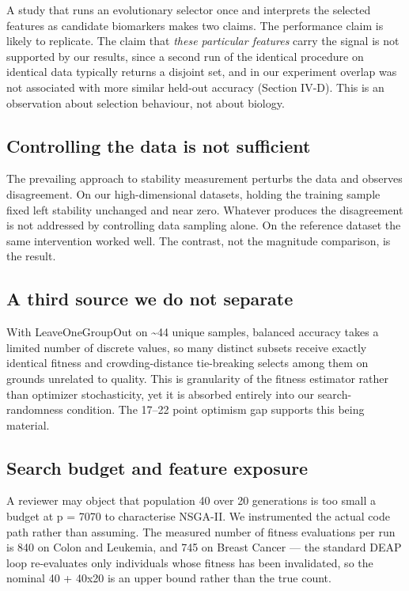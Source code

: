 \documentclass[conference]{IEEEtran}
\begin{document}
A study that runs an evolutionary selector once and interprets the selected features as candidate biomarkers makes two claims. The performance claim is likely to replicate. The claim that \emph{these particular features} carry the signal is not supported by our results, since a second run of the identical procedure on identical data typically returns a disjoint set, and in our experiment overlap was not associated with more similar held-out accuracy (Section IV-D). This is an observation about selection behaviour, not about biology.

\subsection{Controlling the data is not sufficient}

The prevailing approach to stability measurement perturbs the data and observes disagreement. On our high-dimensional datasets, holding the training sample fixed left stability unchanged and near zero. Whatever produces the disagreement is not addressed by controlling data sampling alone. On the reference dataset the same intervention worked well. The contrast, not the magnitude comparison, is the result.

\subsection{A third source we do not separate}

With LeaveOneGroupOut on \textasciitilde44 unique samples, balanced accuracy takes a limited number of discrete values, so many distinct subsets receive exactly identical fitness and crowding-distance tie-breaking selects among them on grounds unrelated to quality. This is granularity of the fitness estimator rather than optimizer stochasticity, yet it is absorbed entirely into our search-randomness condition. The 17--22 point optimism gap supports this being material.

\subsection{Search budget and feature exposure}

A reviewer may object that population 40 over 20 generations is too small a budget at p = 7070 to characterise NSGA-II. We instrumented the actual code path rather than assuming. The measured number of fitness evaluations per run is 840 on Colon and Leukemia, and 745 on Breast Cancer --- the standard DEAP loop re-evaluates only individuals whose fitness has been invalidated, so the nominal 40 + 40x20 is an upper bound rather than the true count.
\end{document}
